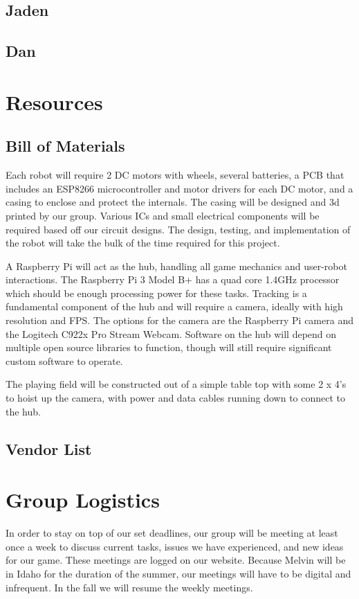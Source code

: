 \documentclass[11pt]{ieeeconf}
\begin{document}
\subsection{Jaden}

\subsection{Dan}

\section{Resources}
\subsection{Bill of Materials}

Each robot will require 2 DC motors with wheels, several batteries, a PCB that includes an ESP8266 microcontroller and motor drivers for each DC motor, and a casing to enclose and protect the internals. The casing will be designed and 3d printed by our group. Various ICs and small electrical components will be required based off our circuit designs. The design, testing, and implementation of the robot will take the bulk of the time required for this project.

A Raspberry Pi will act as the hub, handling all game mechanics and user-robot interactions. The Raspberry Pi 3 Model B+ has a quad core 1.4GHz processor which should be enough processing power for these tasks. Tracking is a fundamental component of the hub and will require a camera, ideally with high resolution and FPS. The options for the camera are the Raspberry Pi camera and the Logitech C922x Pro Stream Webcam. Software on the hub will depend on multiple open source libraries to function, though will still require significant custom software to operate.

The playing field will be constructed out of a simple table top with some 2 x 4's to hoist up the camera, with power and data cables running down to connect to the hub.

\subsection{Vendor List}

\section{Group Logistics}
In order to stay on top of our set deadlines, our group will be meeting at least once a week to discuss current tasks, issues we have experienced, and new ideas for our game. These meetings are logged on our website. Because Melvin will be in Idaho for the duration of the summer, our meetings will have to be digital and infrequent. In the fall we will resume the weekly meetings.
\end{document}
